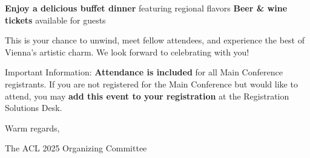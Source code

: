 \textbf{Enjoy a delicious buffet dinner} featuring regional flavors
\textbf{Beer & wine tickets} available for guests

This is your chance to unwind, meet fellow attendees, and experience the best of Vienna’s artistic charm. We look forward to celebrating with you!

Important Information:
\textbf{Attendance is included} for all Main Conference registrants.
If you are not registered for the Main Conference but would like to attend, you may \textbf{add this event to your registration} at the Registration Solutions Desk.

Warm regards,

The ACL 2025 Organizing Committee
